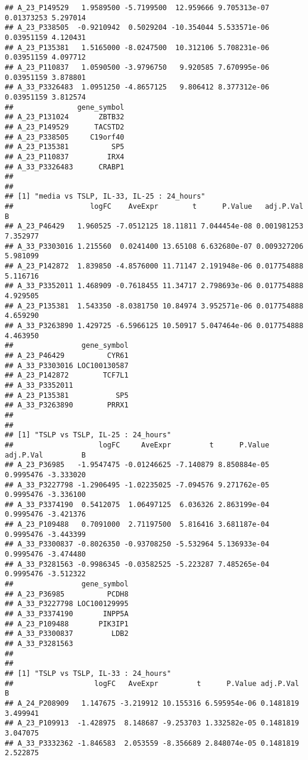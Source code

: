 \documentclass[
]{article}
\begin{document}
\begin{verbatim}
## A_23_P149529   1.9589500 -5.7199500  12.959666 9.705313e-07 0.01373253 5.297014
## A_23_P338505  -0.9210942  0.5029204 -10.354044 5.533571e-06 0.03951159 4.120431
## A_23_P135381   1.5165000 -8.0247500  10.312106 5.708231e-06 0.03951159 4.097712
## A_23_P110837   1.0590500 -3.9796750   9.920585 7.670995e-06 0.03951159 3.878801
## A_33_P3326483  1.0951250 -4.8657125   9.806412 8.377312e-06 0.03951159 3.812574
##               gene_symbol
## A_23_P131024       ZBTB32
## A_23_P149529      TACSTD2
## A_23_P338505     C19orf40
## A_23_P135381          SP5
## A_23_P110837         IRX4
## A_33_P3326483      CRABP1
## 
## 
## [1] "media vs TSLP, IL-33, IL-25 : 24_hours"
##                  logFC    AveExpr        t      P.Value   adj.P.Val        B
## A_23_P46429   1.960525 -7.0512125 18.11811 7.044454e-08 0.001981253 7.352977
## A_33_P3303016 1.215560  0.0241400 13.65108 6.632680e-07 0.009327206 5.981099
## A_23_P142872  1.839850 -4.8576000 11.71147 2.191948e-06 0.017754888 5.116716
## A_33_P3352011 1.468909 -0.7618455 11.34717 2.798693e-06 0.017754888 4.929505
## A_23_P135381  1.543350 -8.0381750 10.84974 3.952571e-06 0.017754888 4.659290
## A_33_P3263890 1.429725 -6.5966125 10.50917 5.047464e-06 0.017754888 4.463950
##                gene_symbol
## A_23_P46429          CYR61
## A_33_P3303016 LOC100130587
## A_23_P142872        TCF7L1
## A_33_P3352011             
## A_23_P135381           SP5
## A_33_P3263890        PRRX1
## 
## 
## [1] "TSLP vs TSLP, IL-25 : 24_hours"
##                    logFC     AveExpr         t      P.Value adj.P.Val         B
## A_23_P36985   -1.9547475 -0.01246625 -7.140879 8.850884e-05 0.9995476 -3.333020
## A_33_P3227798 -1.2906495 -1.02235025 -7.094576 9.271762e-05 0.9995476 -3.336100
## A_33_P3374190  0.5412075  1.06497125  6.036326 2.863199e-04 0.9995476 -3.421376
## A_23_P109488   0.7091000  2.71197500  5.816416 3.681187e-04 0.9995476 -3.443399
## A_33_P3300837 -0.8026350 -0.93708250 -5.532964 5.136933e-04 0.9995476 -3.474480
## A_33_P3281563 -0.9986345 -0.03582525 -5.223287 7.485265e-04 0.9995476 -3.512322
##                gene_symbol
## A_23_P36985          PCDH8
## A_33_P3227798 LOC100129995
## A_33_P3374190       INPP5A
## A_23_P109488       PIK3IP1
## A_33_P3300837         LDB2
## A_33_P3281563             
## 
## 
## [1] "TSLP vs TSLP, IL-33 : 24_hours"
##                   logFC   AveExpr         t      P.Value adj.P.Val        B
## A_24_P208909   1.147675 -3.219912 10.155316 6.595954e-06 0.1481819 3.499941
## A_23_P109913  -1.428975  8.148687 -9.253703 1.332582e-05 0.1481819 3.047075
## A_33_P3332362 -1.846583  2.053559 -8.356689 2.848074e-05 0.1481819 2.522875

\end{verbatim}
\end{document}
